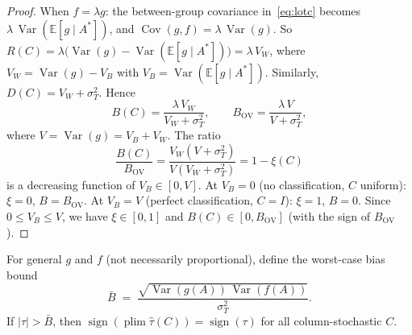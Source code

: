 \begin{proof}
When $f=\lambda g$: the between-group covariance in~\eqref{eq:lotc} becomes $\lambda\,\operatorname{Var}(\mathbb{E}[g\mid A^*])$, and $\operatorname{Cov}(g,f)=\lambda\,\operatorname{Var}(g)$.
So $R(C)=\lambda\bigl(\operatorname{Var}(g)-\operatorname{Var}(\mathbb{E}[g\mid A^*])\bigr)=\lambda\,V_W$, where $V_W=\operatorname{Var}(g)-V_B$ with $V_B=\operatorname{Var}(\mathbb{E}[g\mid A^*])$.
Similarly, $D(C)=V_W+\sigma_T^2$.
Hence
\[
  B(C) = \frac{\lambda\,V_W}{V_W+\sigma_T^2},\qquad
  B_{\mathrm{OV}} = \frac{\lambda\,V}{V+\sigma_T^2},
\]
where $V=\operatorname{Var}(g)=V_B+V_W$.
The ratio
\[
  \frac{B(C)}{B_{\mathrm{OV}}} = \frac{V_W(V+\sigma_T^2)}{V(V_W+\sigma_T^2)} = 1 - \xi(C)
\]
is a decreasing function of $V_B\in[0,V]$.
At $V_B=0$ (no classification, $C$ uniform): $\xi=0$, $B=B_{\mathrm{OV}}$.
At $V_B=V$ (perfect classification, $C=I$): $\xi=1$, $B=0$.
Since $0\leq V_B\leq V$, we have $\xi\in[0,1]$ and $B(C)\in[0,B_{\mathrm{OV}}]$ (with the sign of $B_{\mathrm{OV}}$).
\end{proof}

\begin{proposition}
\label{prop:conf_gen}
For general $g$ and $f$ (not necessarily proportional), define the worst-case bias bound
\begin{equation}
  \bar{B} \;=\; \frac{\sqrt{\operatorname{Var}(g(A))\,\operatorname{Var}(f(A))}}{\sigma_T^2}.
  \label{eq:bbar}
\end{equation}
If $|\tau| > \bar{B}$, then $\operatorname{sign}(\operatorname{plim}\hat\tau(C))=\operatorname{sign}(\tau)$ for all column-stochastic $C$.
\end{proposition}

